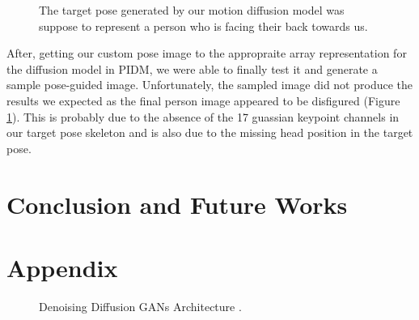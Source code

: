 \documentclass[10pt,twocolumn,letterpaper]{article}
\begin{document}
\begin{figure}[h]
    \centering

    \caption{The target pose generated by our motion diffusion model was suppose to represent a 
    person who is facing their back towards us.}
    \label{fig:pidm-2}
\end{figure}


After, getting our custom pose image to the appropraite array representation for the diffusion model in PIDM, 
we were able to finally test it and generate a sample pose-guided image. Unfortunately, the sampled image 
did not produce the results we expected as the final person image appeared to be disfigured (Figure \ref{fig:pidm-2}). 
This is probably due to the absence of the 17 guassian keypoint channels in our target pose skeleton and 
is also due to the missing head position in the target pose.


\section{Conclusion and Future Works}
\label{sec:conlusion}

\newpage
{\small


}


\appendix
\section{Appendix}

\begin{figure}[h]
    \centering

    \caption{Denoising Diffusion GANs Architecture \cite{Xiao22}.}
    \label{fig:intro-1}
\end{figure}
\end{document}
